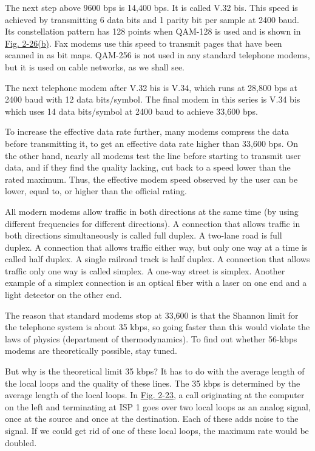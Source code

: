 
The next step above 9600 bps is 14,400 bps. It is called {V.32 bis}.
This speed is achieved by transmitting 6 data bits and 1 parity bit per
sample at 2400 baud. Its constellation pattern has 128 points when
QAM-128 is used and is shown in
\protect\hyperlink{0130661023_ch02lev1sec5.htmlux5cux23ch02fig26}{Fig.
2-26(b)}. Fax modems use this speed to transmit pages that have been
scanned in as bit maps. QAM-256 is not used in any standard telephone
modems, but it is used on cable networks, as we shall see.

The next telephone modem after V.32 bis is {V.34}, which runs at 28,800
bps at 2400 baud with 12 data bits/symbol. The final modem in this
series is {V.34 bis} which uses 14 data bits/symbol at 2400 baud to
achieve 33,600 bps.

To increase the effective data rate further, many modems compress the
data before transmitting it, to get an effective data rate higher than
33,600 bps. On the other hand, nearly all modems test the line before
starting to transmit user data, and if they find the quality lacking,
cut back to a speed lower than the rated maximum. Thus, the {effective}
modem speed observed by the user can be lower, equal to, or higher than
the official rating.

All modern modems allow traffic in both directions at the same time (by
using different frequencies for different directions). A connection that
allows traffic in both directions simultaneously is called {full
duplex}. A two-lane road is full duplex. A connection that allows
traffic either way, but only one way at a time is called {half duplex}.
A single railroad track is half duplex. A connection that allows traffic
only one way is called {simplex}. A one-way street is simplex. Another
example of a simplex connection is an optical fiber with a laser on one
end and a light detector on the other end.

The reason that standard modems stop at 33,600 is that the Shannon limit
for the telephone system is about 35 kbps, so going faster than this
would violate the laws of physics (department of thermodynamics). To
find out whether 56-kbps modems are theoretically possible, stay tuned.

But why is the theoretical limit 35 kbps? It has to do with the average
length of the local loops and the quality of these lines. The 35 kbps is
determined by the average length of the local loops. In
\protect\hyperlink{0130661023_ch02lev1sec5.htmlux5cux23ch02fig23}{Fig.
2-23}, a call originating at the computer on the left and terminating at
ISP 1 goes over two local loops as an analog signal, once at the source
and once at the destination. Each of these adds noise to the signal. If
we could get rid of one of these local loops, the maximum rate would be
doubled.

